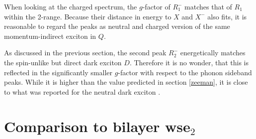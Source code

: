 When looking at the charged spectrum, the $g$-factor of $R_1^-$ matches that of $R_1$ within the 2\sigma-range. Because their distance in energy to $X$ and $X^-$ also fits, it is reasonable to regard the peaks as neutral and charged version of the same momentum-indirect exciton in $Q$.

As discussed in the previous section, the second peak $R_2^-$ energetically matches the spin-unlike but direct dark exciton $D$. Therefore it is no wonder, that this is reflected in the significantly smaller $g$-factor with respect to the phonon sideband peaks. While it is higher than the value predicted in section \ref{zeeman}, it is close to what was reported for the neutral dark exciton \cite{robert_fine_2017}.

\section{Comparison to bilayer ws\textup{e}$_2$}

